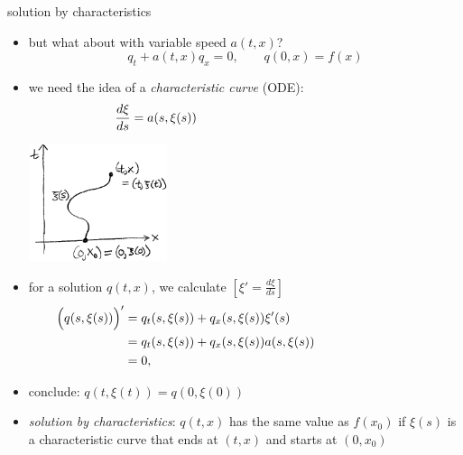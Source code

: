 \documentclass[10pt,dvipsnames,usepdftitle=false,
hyperref={pdftitle = {Finite volume methods},
    pdfauthor = {Ed Bueler}}]{beamer}
\newcommand{\ds}{\displaystyle}
\begin{document}
\begin{frame}{solution by characteristics}

\begin{itemize}
\item but what about with variable speed $a(t,x)$?
    $$q_t + a(t,x) q_x=0, \qquad q(0,x) = f(x)$$
\item we need the idea of a \emph{characteristic curve} (ODE):
    $$\ds \frac{d\xi}{ds} = a(s,\xi(s)) \hspace{50mm}$$

\vspace{-10mm}

\hfill \includegraphics[width=0.32\textwidth]{figs/characteristicsketch}

\vspace{-20mm}
\item for a solution $q(t,x)$, we calculate $\left[\xi'=\tfrac{d\xi}{ds}\right]$
\begin{align*}
\Big(q(s,\xi(s))\Big)' &= q_t(s,\xi(s)) + q_x(s,\xi(s)) \xi'(s) \hspace{40mm} \\
                          &= q_t(s,\xi(s)) + q_x(s,\xi(s)) a(s,\xi(s)) \\
                          &= 0,
\end{align*}
\item conclude: $q(t,\xi(t)) = q(0,\xi(0))$
\item \emph{solution by characteristics}: $q(t,x)$ has the same value as $f(x_0)$ if $\xi(s)$ is a characteristic curve that ends at $(t,x)$ and starts at $(0,x_0)$
\end{itemize}
\end{frame}
\end{document}
